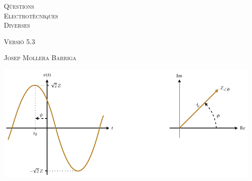 \begin{titlepage}

   \parbox{18cm}{\fontsize{60pt}{60pt}\selectfont\color{NavyBlue}\scshape%
                 Q\"{u}estions\\[30pt] Electrot\`{e}cniques\\[30pt] Diverses}

   \vspace*{1.8cm}
   {\fontsize{30pt}{30pt}\selectfont\textsc{Versi\'{o} 5.3}}

   \vspace*{2cm}
   {\fontsize{40pt}{40pt}\selectfont\textsc{Josep Mollera Barriga}}

   \vspace*{1.5cm}
   \includegraphics[scale=1.3]{Imatges/Not-Fasor.pdf}

\end{titlepage}
